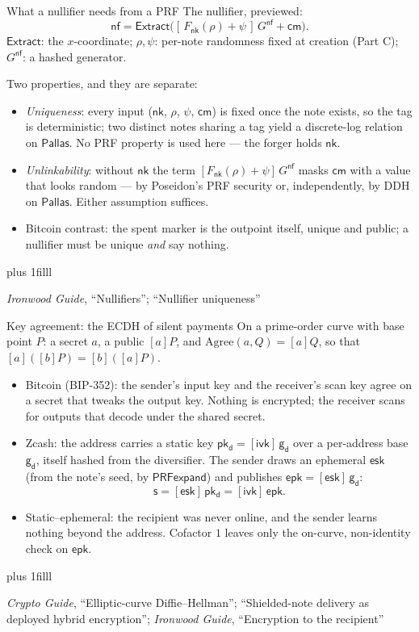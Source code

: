 \documentclass[aspectratio=169,11pt]{beamer}
\newcommand{\Pallas}{\ensuremath{\mathsf{Pallas}}}
\newcommand{\nfsym}{\ensuremath{\mathsf{nf}}}
\newcommand{\cmsym}{\ensuremath{\mathsf{cm}}}
\newcommand{\gd}{\ensuremath{\mathsf{g_d}}}
\newcommand{\pkd}{\ensuremath{\mathsf{pk_d}}}
\newcommand{\nksym}{\ensuremath{\mathsf{nk}}}
\newcommand{\ivk}{\ensuremath{\mathsf{ivk}}}
\newcommand{\esk}{\ensuremath{\mathsf{esk}}}
\newcommand{\epk}{\ensuremath{\mathsf{epk}}}
\newcommand{\Extract}{\ensuremath{\mathsf{Extract}}}
\newcommand{\src}[1]{\par\vskip0pt plus 1filll
  {\fontsize{6}{7.2}\selectfont\color{arbdim}\raggedright #1\par}}
\begin{document}
\begin{frame}{What a nullifier needs from a PRF}
The nullifier, previewed:
\[
  \nfsym = \Extract\bigl([\,F_{\nksym}(\rho) + \psi\,]\,G^{\mathsf{nf}}
    + \cmsym\bigr).
\]
{\small $\Extract$: the $x$-coordinate; $\rho, \psi$: per-note randomness
fixed at creation (Part C); $G^{\mathsf{nf}}$: a hashed generator.}
\par\smallskip
Two properties, and they are separate:
\begin{itemize}
  \item \emph{Uniqueness}: every input ($\nksym$, $\rho$, $\psi$,
    $\cmsym$) is fixed once the note exists, so the tag is deterministic;
    two distinct notes sharing a tag yield a discrete-log relation on
    \Pallas{}. No PRF property is used here --- the forger holds
    $\nksym$.
  \item \emph{Unlinkability}: without $\nksym$ the term
    $[F_{\nksym}(\rho) + \psi]\,G^{\mathsf{nf}}$ masks $\cmsym$ with a
    value that looks random --- by Poseidon's PRF security or,
    independently, by DDH on \Pallas{}. Either assumption suffices.
  \item Bitcoin contrast: the spent marker is the outpoint itself, unique
    and public; a nullifier must be unique \emph{and} say nothing.
\end{itemize}
\src{\emph{Ironwood Guide}, ``Nullifiers''; ``Nullifier uniqueness''}
\end{frame}

\begin{frame}{Key agreement: the ECDH of silent payments}
On a prime-order curve with base point $P$: a secret $a$, a public $[a]P$,
and $\mathrm{Agree}(a, Q) = [a]Q$, so that $[a]([b]P) = [b]([a]P)$.
\begin{itemize}
  \item Bitcoin (BIP-352): the sender's input key and the receiver's scan
    key agree on a secret that tweaks the output key. Nothing is encrypted;
    the receiver scans for outputs that decode under the shared secret.
  \item Zcash: the address carries a static key $\pkd = [\ivk]\,\gd$ over
    a per-address base $\gd$, itself hashed from the diversifier. The
    sender draws an ephemeral $\esk$ (from the note's seed, by
    $\mathsf{PRFexpand}$) and publishes $\epk = [\esk]\,\gd$:
    \[
      \mathsf{s} = [\esk]\,\pkd = [\ivk]\,\epk .
    \]
  \item Static--ephemeral: the recipient was never online, and the sender
    learns nothing beyond the address. Cofactor $1$ leaves only the
    on-curve, non-identity check on $\epk$.
\end{itemize}
\src{\emph{Crypto Guide}, ``Elliptic-curve Diffie--Hellman'';
  ``Shielded-note delivery as deployed hybrid encryption'';
  \emph{Ironwood Guide}, ``Encryption to the recipient''}
\end{frame}
\end{document}
